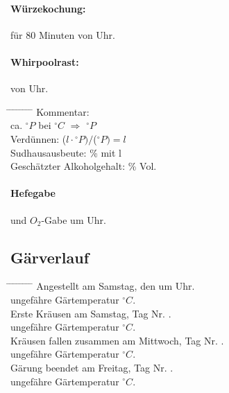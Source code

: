 \documentclass[12pt,oneside,a4paper]{scrartcl}
\begin{document}
{\paragraph{Würzekochung:} für 80 Minuten von  Uhr.\\
\paragraph{Whirpoolrast:} von  Uhr.
	\begin{tabbing}
		\hspace{1cm} \= \hspace{1cm} \= \hspace{1cm} \= \hspace{1cm} \= \hspace{1cm} \= \hspace{1cm} \= \hspace{1cm} \= \hspace{1cm} \= \kill
		\> Kommentar: \>\>\> \\
		\> \> \> ca. $^\circ P$ \> \> bei \> $^\circ C$ \> $\Rightarrow$ \> $^\circ P$\\
		\> \> Verdünnen: \> \> \> \> \> ($l \cdot$$ ^\circ P)/$($^\circ P)= l$\\
		\> \> Sudhausausbeute: \> \> \> \> \>  \% mit l\\
		\> \> Geschätzter Alkoholgehalt: \> \> \> \> \> \% Vol.
	\end{tabbing}
%
\paragraph{Hefegabe} und $O_2$-Gabe um  Uhr.
%
\subsection*{Gärverlauf}
	\begin{tabbing}
		\hspace{1cm} \= \hspace{1cm} \= \hspace{1cm} \= \hspace{1cm} \= \hspace{1cm} \= \hspace{1cm} \= \hspace{1cm} \= \hspace{1cm} \= \kill
		\> Angestellt am Samstag, den  um  Uhr.\\
		\> \> ungefähre Gärtemperatur  $^\circ C$.\\
		\> Erste Kräusen am Samstag,  Tag Nr. .\\
		\> \> ungefähre Gärtemperatur $^\circ C$.\\
		\> Kräusen fallen zusammen am Mittwoch, Tag Nr. .\\
		\> \> ungefähre Gärtemperatur $^\circ C$.\\
		\> Gärung beendet am Freitag, Tag Nr. .\\
		\> \> ungefähre Gärtemperatur $^\circ C$.
	\end{tabbing}
%
}
\end{document}
